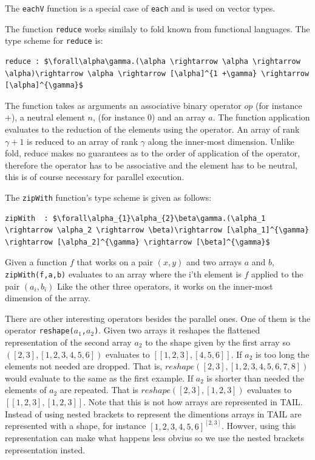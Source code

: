 \documentclass[11pt]{article}
\begin{document}
The {\tt eachV} function is a special case of {\tt each} and is used on vector types.

The function {\tt reduce} works similaly to fold known from functional languages. The type scheme for {\tt reduce} is:
\begin{lstlisting}[numbers=none,frame=none]
reduce : $\forall\alpha\gamma.(\alpha \rightarrow \alpha \rightarrow \alpha)\rightarrow \alpha \rightarrow [\alpha]^{1 +\gamma} \rightarrow [\alpha]^{\gamma}$
\end{lstlisting}
The function takes as arguments an associative binary operator $op$ (for instance $+$), a neutral element $n$, (for instance 0) and an array $a$.
The function application evaluates to the reduction of the elements using the operator.
An array of rank $\gamma+1$ is reduced to an array of rank $\gamma$ along the inner-most dimension.
Unlike fold, reduce makes no guarantees as to the order of application of the operator, therefore the operator has to be associative and the element has to be neutral, this is of course necessary for parallel execution.

The {\tt zipWith} function's type scheme is given as follows: 
\begin{lstlisting}[numbers=none,frame=none]
zipWith  : $\forall\alpha_{1}\alpha_{2}\beta\gamma.(\alpha_1 \rightarrow \alpha_2 \rightarrow \beta)\rightarrow [\alpha_1]^{\gamma} \rightarrow [\alpha_2]^{\gamma} \rightarrow [\beta]^{\gamma}$
\end{lstlisting}
Given a function $f$ that works on a pair $(x,y)$ and two arrays $a$ and $b$, {\tt zipWith(f,a,b)}  evaluates to an array where the i'th element is $f$ applied to the pair $(a_i,b_i)$ 
Like the other three operators, it works on the inner-most dimension of the array\cite{ElsmanDybdal:Array:2014}.

There are other interesting operators besides the parallel ones. One of them is the operator {\tt reshape($a_1$,$a_2$)}.
Given two arrays it reshapes the flattened representation of the second array $a_2$ to the shape given by the first array so $([2,3],[1,2,3,4,5,6])$ evaluates to $[[1,2,3],[4,5,6]]$. 
If $a_2$ is too long the elements not needed are dropped. That is, $reshape([2,3],[1,2,3,4,5,6,7,8])$ would evaluate to the same as the first example.
If $a_2$ is shorter than needed the elements of $a_2$ are repeated. That is $reshape([2,3],[1,2,3])$ evaluates to $[[1,2,3],[1,2,3]]$. Note that this is not how arrays are represented in TAIL. Instead of using nested brackets to represent the dimentions arrays in TAIL are represented with a shape, for instance $[1,2,3,4,5,6]^{[2,3]}$. Howver, using this representation can make what happens less obvius so we use the nested brackets representation insted. 
\end{document}
